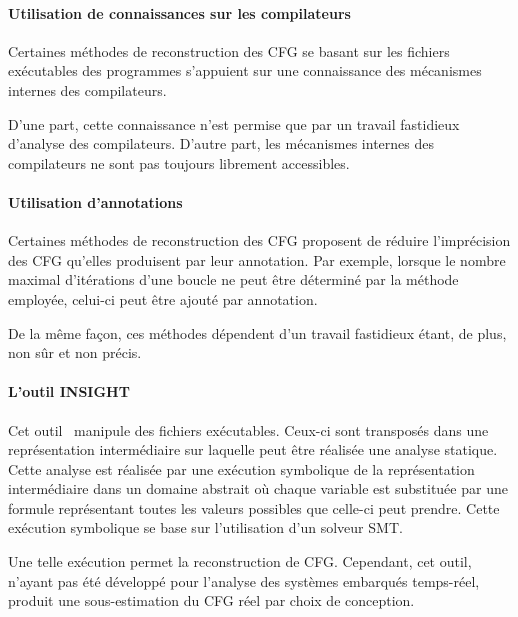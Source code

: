       \paragraph{Utilisation de connaissances sur les compilateurs}
      { Certaines méthodes de reconstruction des CFG se basant sur les fichiers
        exécutables des programmes s'appuient sur une connaissance des
        mécanismes internes des compilateurs.

        D'une part, cette connaissance n'est permise que par un travail
        fastidieux d'analyse des compilateurs. D'autre part, les mécanismes
        internes des compilateurs ne sont pas toujours librement accessibles. }

      \paragraph{Utilisation d'annotations}
      { Certaines méthodes de reconstruction des CFG proposent de réduire
        l'imprécision des CFG qu'elles produisent par leur annotation. Par
        exemple, lorsque le nombre maximal d'itérations d'une boucle ne peut
        être déterminé par la méthode employée, celui-ci peut être ajouté par
        annotation.
        
        De la même façon, ces méthodes dépendent d'un travail fastidieux étant,
        de plus, non sûr et non précis. }


      \paragraph{L'outil \textsc{INSIGHT}}
      { Cet outil~\cite{FLP15} manipule des fichiers exécutables. Ceux-ci sont
        transposés dans une représentation intermédiaire sur laquelle peut être
        réalisée une analyse statique. Cette analyse est réalisée par une
        exécution symbolique de la représentation intermédiaire dans un domaine
        abstrait où chaque variable est substituée par une formule représentant
        toutes les valeurs possibles que celle-ci peut prendre. Cette exécution
        symbolique se base sur l'utilisation d'un solveur SMT.

        Une telle exécution permet la reconstruction de CFG. Cependant, cet
        outil, n'ayant pas été développé pour l'analyse des systèmes embarqués
        temps-réel, produit une sous-estimation du CFG réel par choix de
        conception. }

